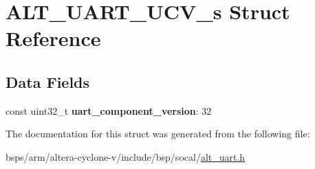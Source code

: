 \hypertarget{structALT__UART__UCV__s}{}\section{A\+L\+T\+\_\+\+U\+A\+R\+T\+\_\+\+U\+C\+V\+\_\+s Struct Reference}
\label{structALT__UART__UCV__s}
\subsection*{Data Fields}
\begin{DoxyCompactItemize}
\item 
\mbox{\label{structALT__UART__UCV__s_aa3b7d3437164a6bc12efa4b46eba0f0b}} 
const uint32\+\_\+t {\bfseries uart\+\_\+component\+\_\+version}\+: 32
\end{DoxyCompactItemize}


The documentation for this struct was generated from the following file\+:\begin{DoxyCompactItemize}
\item 
bsps/arm/altera-\/cyclone-\/v/include/bsp/socal/\mbox{\hyperlink{alt__uart_8h}{alt\+\_\+uart.\+h}}\end{DoxyCompactItemize}
